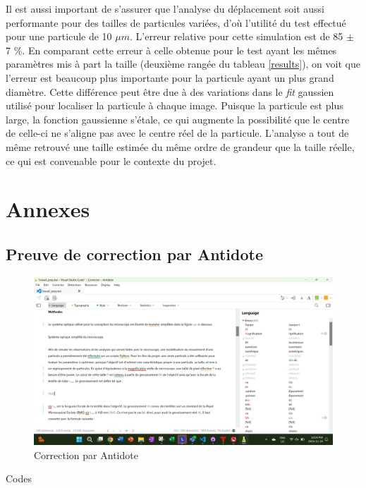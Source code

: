 \documentclass[conference]{IEEEtran}
\begin{document}
Il est aussi important de s'assurer que l'analyse du déplacement soit aussi performante pour des tailles de particules variées, d'où l'utilité du test 
effectué pour une particule de 10 $\mu m$. L'erreur relative pour cette simulation est de 85 $\pm$ 7 \%. En comparant cette erreur à celle obtenue pour le test ayant les mêmes paramètres mis à part la taille (deuxième
rangée du tableau \ref{results}), on voit que l'erreur est beaucoup plus importante pour la particule ayant un plus grand diamètre. Cette différence peut être due à des variations dans le \textit{fit} gaussien utilisé pour localiser
la particule à chaque image. Puisque la particule est plus large, la fonction gaussienne s'étale, ce qui augmente la possibilité que le centre de celle-ci ne s'aligne pas
avec le centre réel de la particule. L'analyse a tout de même retrouvé une taille estimée du même ordre de grandeur que la taille réelle, ce qui est convenable pour le contexte du projet.

\printbibliography

\clearpage

\section{Annexes}

\subsection{Preuve de correction par Antidote}
\begin{figure}[H]
  \centering
  \includegraphics[scale=0.1]{Screenshot (113).png}
  \caption{Correction par Antidote}
\end{figure}
\clearpage


Codes
\end{document}

